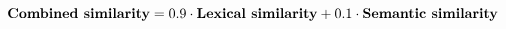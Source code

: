 \begin{equation*}
  \text{\textbf{Combined similarity}} =
    0.9\cdot\text{\textbf{Lexical similarity}} +
    0.1\cdot\text{\textbf{Semantic similarity}}
\end{equation*}
